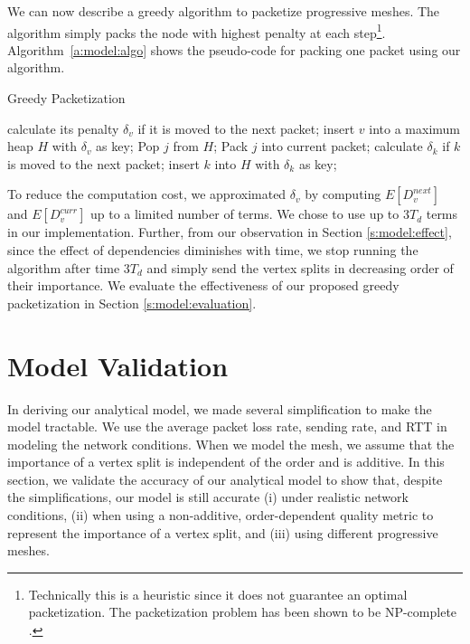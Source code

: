 We can now describe a greedy algorithm to packetize progressive meshes.
The algorithm simply packs the node with highest penalty
at each step\footnote{Technically this is a heuristic since it does not
guarantee an optimal packetization.  The packetization problem has been
shown to be NP-complete \cite{Gu:Packetization}.}.
Algorithm~\ref{a:model:algo} shows the pseudo-code for packing one packet using
our algorithm.

\begin{algorithm}
\caption{Greedy Packetization\label{a:model:algo}}
\begin{algorithmic}
    \STATE calculate its penalty $\delta_v$ if it is moved to the next packet;
    \STATE insert $v$ into a maximum heap $H$ with $\delta_v$ as key;
\ENDFOR
{}
\STATE Pop $j$ from $H$;
\STATE Pack $j$ into current packet;
    \STATE calculate $\delta_k$ if $k$ is moved to the next packet;
    \STATE insert $k$ into $H$ with $\delta_k$ as key;
\ENDFOR
\ENDWHILE
\end{algorithmic}
\end{algorithm}

To reduce the computation cost, we approximated $\delta_v$ by computing $E[D_v^{next}]$
and $E[D_v^{curr}]$ up to a limited number of terms.  We chose to use up to $3T_d$
terms in our implementation.  Further, from our observation in Section \ref{s:model:effect},
since the effect of dependencies diminishes with time, we stop running the algorithm
after time $3T_d$ and simply send the vertex splits in decreasing
order of their importance.  We evaluate the effectiveness of our proposed greedy packetization in Section \ref{s:model:evaluation}.

\section{Model Validation}
\label{s:model:experiment}

In deriving our analytical model, we made several 
simplification to make the model tractable.  We use the average
packet loss rate, sending rate, and RTT in modeling the network conditions.
When we model the mesh, we assume that the importance of a vertex split is 
independent of the order and is additive.  In this section, we validate the
accuracy of our analytical model to show that, despite the simplifications,
our model is still accurate (i) under realistic network conditions, (ii) when
using a non-additive, order-dependent quality metric to represent the importance
of a vertex split, and (iii) using different progressive meshes.

